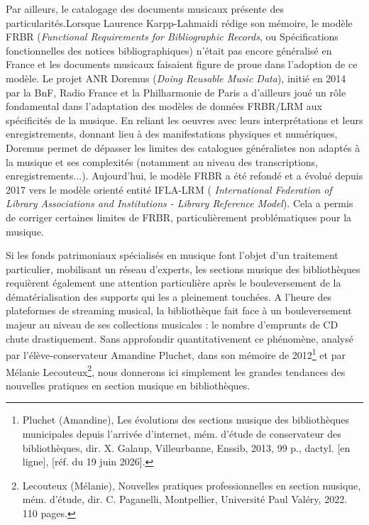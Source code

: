  Par ailleurs, le catalogage des documents musicaux présente des particularités.Lorsque Laurence Karpp-Lahmaidi rédige son mémoire, le modèle FRBR (\textit{Functional Requirements for Bibliographic Records}, ou Spécifications fonctionnelles des notices bibliographiques) n'était pas encore généralisé en France et les documents musicaux faisaient figure de proue dans l'adoption de ce modèle. Le projet ANR Doremus (\textit{Doing Reusable Music Data}), initié en 2014 par la BnF, Radio France et la Philharmonie de Paris a d'ailleurs joué un rôle fondamental dans l'adaptation des modèles de données FRBR/LRM aux spécificités de la musique. En reliant les oeuvres avec leurs interprétations et leurs enregistrements, donnant lieu à des manifestations physiques et numériques, Doremus permet de dépasser les limites des catalogues généralistes non adaptés à la musique et ses complexités (notamment au niveau des transcriptions, enregistrements...). Aujourd'hui, le modèle FRBR a été refondé et a évolué depuis 2017 vers le modèle orienté entité IFLA-LRM (\textit{ International Federation of Library Associations and Institutions - Library Reference Model}). Cela a permis de corriger certaines limites de FRBR, particulièrement problématiques pour la musique. 

Si les fonds patrimoniaux spécialisés en musique font l'objet d'un traitement particulier, mobilisant un réseau d'experts, les sections musique des bibliothèques requièrent également une attention particulière après le bouleversement de la dématérialisation des supports qui les a pleinement touchées. 
A l'heure des plateformes de streaming musical, la bibliothèque fait face à un bouleversement majeur au niveau de ses collections musicales : le nombre d'emprunts de CD chute drastiquement. Sans approfondir quantitativement ce phénomène, analysé par l'élève-conservateur Amandine Pluchet, dans son mémoire de 2012\footnote{Pluchet (Amandine), Les évolutions des sections musique des bibliothèques municipales depuis l’arrivée d’internet, mém. d'étude de conservateur des bibliothèques, dir. X. Galaup, Villeurbanne, Enssib, 2013, 99 p., dactyl. [en ligne], [réf. du 19 juin 2026].} et par Mélanie Lecouteux\footnote{Lecouteux (Mélanie), Nouvelles pratiques professionnelles en section musique, mém. d'étude, dir. C. Paganelli, Montpellier, Université Paul Valéry, 2022. 110 pages.}, nous donnerons ici simplement les grandes tendances des nouvelles pratiques en section musique en bibliothèques. \\

